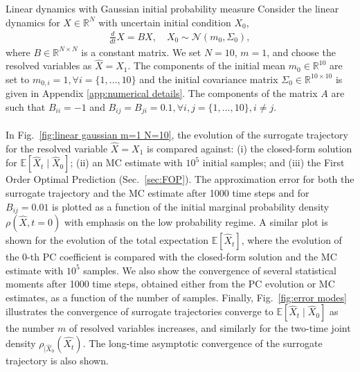 \documentclass[11pt, a4paper, oneside, reqno]{amsart}
\makeatletter
\def\subsection{\@startsection{subsection}{2}%
	\z@{.5\linespacing\@plus.7\linespacing}{.5\linespacing}%
	{\normalfont\large\bfseries}}
\makeatother
\begin{document}
\subsection{Linear dynamics with Gaussian initial probability measure}\label{sec:linear ode gaussian}
\noindent Consider the linear dynamics for $X\in\mathbb{R}^N$ with uncertain initial condition $X_0$,
\begin{eqnarray}\label{eq:linear system ODE}
    \frac{d}{dt}X = BX,\quad
    X_0 \sim \mathcal{N}(m_0,\Sigma_0),
\end{eqnarray}
where $B \in \mathbb{R}^{N\times N}$ is a constant matrix. 
We set $N=10$, $m=1$, and choose the resolved variables as $\hat{X}=X_1$.
The components of the initial mean $m_0\in\mathbb{R}^{10}$ are set to $m_{0,i}=1, \forall i = \{1,\dots,10\}$ and the initial covariance matrix $\Sigma_0\in\mathbb{R}^{10 \times 10}$ is given in Appendix \ref{app:numerical details}.
The components of the matrix $A$ are such that $B_{ii}=-1$ and $B_{ij}=B_{ji}=0.1, \forall i,j= \{1,\dots,10\}, i\neq j$.
\\ \ \\
In Fig.~\ref{fig:linear gaussian m=1 N=10}, the evolution of the surrogate trajectory for the resolved variable $\hat{X}=X_1$ is compared against: (i) the closed-form solution for $\mathbb{E}[\hat{X}_t\mid\hat{X}_0]$; (ii) an MC estimate with $10^5$ initial samples; and (iii) the First Order Optimal Prediction (Sec.~\ref{sec:FOP}).
The approximation error for both the surrogate trajectory and the MC estimate after 1000 time steps and for $B_{ij}=0.01$ is plotted as a function of the initial marginal probability density $\rho(\hat{X},t=0)$ with emphasis on the low probability regime. 
A similar plot is shown for the evolution of the total expectation $\mathbb{E}[\hat{X}_t]$, where the evolution of the 0-th PC coefficient is compared with the closed-form solution and the MC estimate with $10^5$ samples. 
We also show the convergence of several statistical moments after 1000 time steps, obtained either from the PC evolution or MC estimates, as a function of the number of samples. Finally, Fig.~\ref{fig:error modes} illustrates the convergence of surrogate trajectories converge to $\mathbb{E}[\hat{X}_t\mid\hat{X}_0]$ as the number $m$ of resolved variables increases, and similarly for the two-time joint density $\rho_{|\hat{X}_0}(\hat{X_t})$.
The long-time asymptotic convergence of the surrogate trajectory is also shown. 
\end{document}
